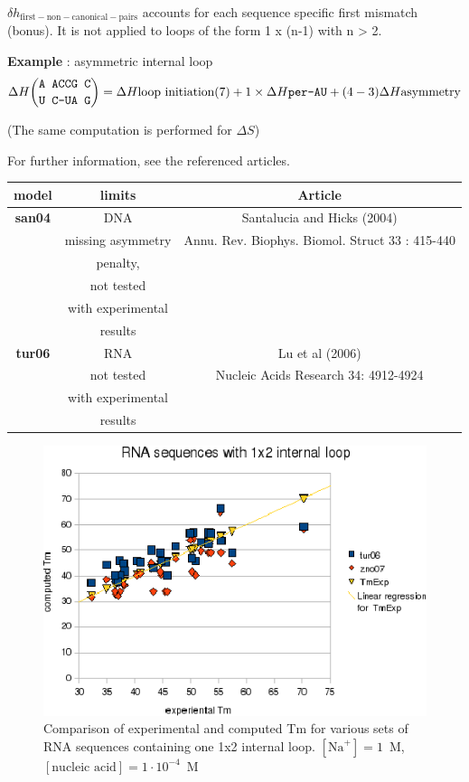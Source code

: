\documentclass{article}
\begin{document}
$\delta{}h_\mathrm{first-non-canonical-pairs}$ accounts for each sequence
specific first mismatch (bonus). It is not applied to loops of the form 1 x (n-1) with
n > 2.


\textbf{Example} : asymmetric internal loop
\begin{multline*}
\Delta H {\mbox{\texttt{A ACCG C}} \choose \mbox{\texttt{U C-UA G}}} = 
\Delta H {\mbox{loop initiation(7)}} +
1 \times \Delta H {\mbox{\texttt{per-AU}}} +
(4 - 3)\Delta H {\mbox{asymmetry}}\\
\end{multline*}

       (The same computation is performed for $\Delta S$)    
       
For further information, see the referenced articles.

\begin{table}[hc]
\begin{tabular}[h]{| c | c | c |}
\textbf{model} & \textbf{limits} & \textbf{Article} \\
\hline
\textbf{san04} & DNA & Santalucia and Hicks (2004) \\
 & missing asymmetry & Annu. Rev. Biophys. Biomol. Struct 33 : 415-440\\
 & penalty, & \\
 & not tested & \\
 & with experimental & \\
 & results & \\
 \hline
\textbf{tur06} & RNA & Lu et al (2006) \\
 & not tested & Nucleic Acids Research 34: 4912-4924 \\
 & with experimental & \\
 & results & \\
 \hline
\end{tabular}
\end{table}

\begin{figure}[h]
\includegraphics[width=1\linewidth]{images/1x2InternalLoop}
\caption{Comparison of experimental and computed Tm for various sets of
 RNA sequences containing one 1x2 internal loop. $[\mbox{Na}^+] = 1$~M, $[\mbox{nucleic acid}] = 1\cdot{}10^{-4}$~M}
\end{figure}
\end{document}
